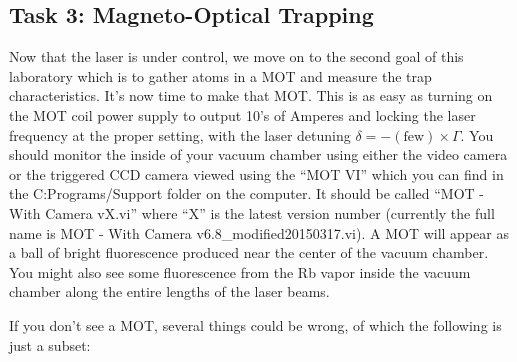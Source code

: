 \documentclass{../lab}
\begin{document}

\subsection{Task 3: Magneto-Optical Trapping}

Now that the laser is under control, we move on to the second goal of this laboratory which is to gather atoms in a MOT and measure the trap characteristics. It's now time to make that MOT. This is as easy as turning on the MOT coil power supply to output 10's of Amperes and locking the laser frequency at the proper setting, with the laser detuning $\delta = - (\text{few}) \times \Gamma $. You should monitor the inside of your vacuum chamber using either the video camera or the triggered CCD camera viewed using the ``MOT VI'' which you can find in the C:Programs/Support folder on the computer. It should be called ``MOT - With Camera vX.vi'' where ``X'' is the latest version number (currently the full name is MOT - With Camera v6.8\_modified20150317.vi). A MOT will appear as a ball of bright fluorescence produced near the center of the vacuum chamber. You might also see some fluorescence from the Rb vapor inside the vacuum chamber along the entire lengths of the laser beams.

If you don't see a MOT, several things could be wrong, of which the following is just a subset:
\end{document}
